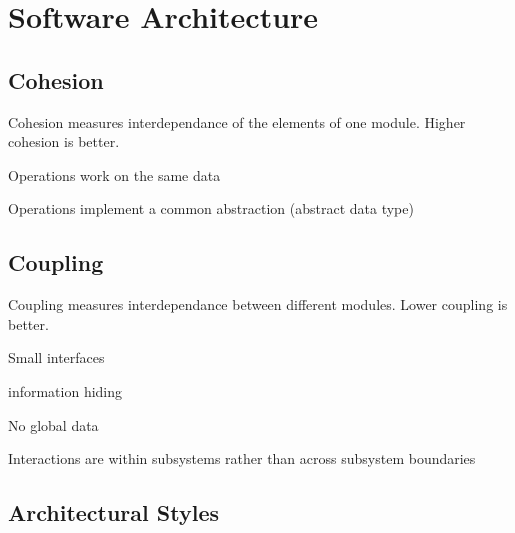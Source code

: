 \section{Software Architecture}

\subsection{Cohesion}
Cohesion measures interdependance of the elements of one module. Higher cohesion is better.
\enumstart
	\item Operations work on the same data
	\item Operations implement a common abstraction (abstract data type)
\enumend

\subsection{Coupling}
Coupling measures interdependance between different modules. Lower coupling is better.
\enumstart
	\item Small interfaces
	\item information hiding
	\item No global data
	\item Interactions are within subsystems rather than across subsystem boundaries
\enumend

\subsection{Architectural Styles}


